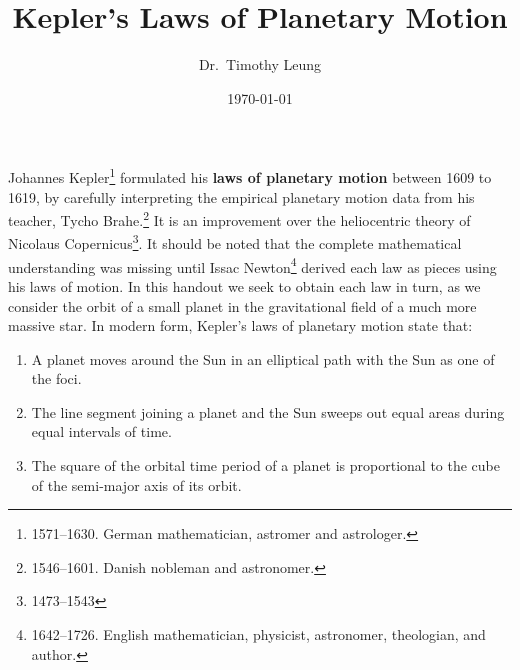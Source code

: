 \documentclass{../../../oss-handout}
\title{Kepler's Laws of Planetary Motion}
\author{Dr.\ Timothy Leung}
\date{\today}
\newcommand{\mb}[1]{\ensuremath\mathbf{#1}}
\newcommand{\pic}[2]{\texttt{[image: \#2]}}
\begin{document}
\thispagestyle{title}
\gentitle

%
%
%
%
%

%
%
Johannes Kepler\footnote{1571--1630. German mathematician, astromer and
  astrologer.} formulated his \textbf{laws of planetary motion}
between 1609 to 1619, by carefully interpreting the empirical planetary motion
data from his teacher, Tycho Brahe.\footnote{1546--1601. Danish nobleman and
  astronomer.} It is an improvement over the heliocentric
theory of Nicolaus Copernicus\footnote{1473--1543}. It should be noted that the
complete mathematical understanding was missing until Issac
Newton\footnote{1642--1726. English mathematician, physicist, astronomer,
  theologian, and author.} derived each law as pieces using his laws of motion.
In this handout we seek to obtain each law in turn, as we consider the orbit of
a small planet in the gravitational field of a much more massive star. In
modern form, Kepler's laws of planetary motion state that:
\begin{enumerate}[leftmargin=18pt,noitemsep,topsep=0pt]
\item A planet moves around the Sun in an elliptical path with the Sun as one
  of the foci.
\item The line segment joining a planet and the Sun sweeps out equal areas
  during equal intervals of time.
\item The square of the orbital time period of a planet is proportional to the
  cube of the semi-major axis of its orbit.
\end{enumerate}
\end{document}
